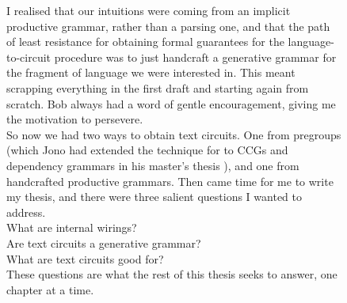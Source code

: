 \begin{figure}[h!]
\centering
{}
\caption{I realised that our intuitions were coming from an implicit productive grammar, rather than a parsing one, and that the path of least resistance for obtaining formal guarantees for the language-to-circuit procedure was to just handcraft a generative grammar for the fragment of language we were interested in. This meant scrapping everything in the first draft and starting again from scratch. Bob always had a word of gentle encouragement, giving me the motivation to persevere.\\

So now we had two ways to obtain text circuits. One from pregroups (which Jono had extended the technique for to CCGs and dependency grammars in his master's thesis \citep{liuLanguageCircuits2021a}), and one from handcrafted productive grammars. Then came time for me to write my thesis, and there were three salient questions I wanted to address.\\
What are internal wirings?\\
Are text circuits a generative grammar?\\
What are text circuits good for?\\
These questions are what the rest of this thesis seeks to answer, one chapter at a time.
}
\end{figure}